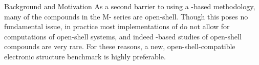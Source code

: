 \begin{section}{Background and Motivation}
As a second barrier to using a \sapt-based methodology, many of the compounds in the M- series are
open-shell. Though this poses no fundamental issue, 
in practice most implementations of \sapt 
do not allow for computations of open-shell systems, and indeed
\sapt-based studies of open-shell compounds are very
rare.\cite{Zuchowski2008a} For these reasons, a new, open-shell-compatible electronic structure
benchmark is highly preferable.


\end{section}


